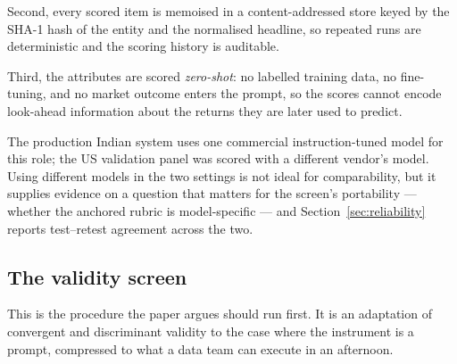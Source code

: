 \documentclass[preprint,12pt,authoryear]{elsarticle}
\theoremstyle{plain}
\theoremstyle{remark}
\begin{document}
Second, every scored item is memoised in a content-addressed store keyed by the
SHA-1 hash of the entity and the normalised headline, so repeated runs are
deterministic and the scoring history is auditable.

Third, the attributes are scored \emph{zero-shot}: no labelled training data, no
fine-tuning, and no market outcome enters the prompt, so the scores cannot
encode look-ahead information about the returns they are later used to predict.

The production Indian system uses one commercial instruction-tuned model for
this role; the US validation panel was scored with a different vendor's model.
Using different models in the two settings is not ideal for comparability, but
it supplies evidence on a question that matters for the screen's portability ---
whether the anchored rubric is model-specific --- and
Section~\ref{sec:reliability} reports test--retest agreement across the two.

\subsection{The validity screen}\label{sec:screen}

This is the procedure the paper argues should run first. It is an adaptation of
convergent and discriminant validity \citep{campbell1959,cronbach1955} to the
case where the instrument is a prompt, compressed to what a data team can
execute in an afternoon.
\end{document}
